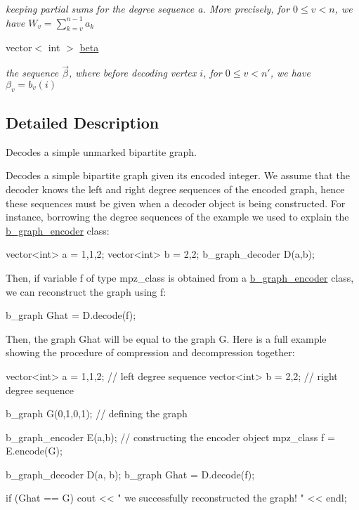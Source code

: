 \begin{DoxyCompactItemize}
\begin{DoxyCompactList}\small\item\em keeping partial sums for the degree sequence a. More precisely, for $0 \leq v < n$, we have $W_v = \sum_{k=v}^{n-1} a_k$ \end{DoxyCompactList}\item 
vector$<$ int $>$ \hyperlink{classb__graph__decoder_a3e5babfb07af486c1d9e991f65251266}{beta}
\begin{DoxyCompactList}\small\item\em the sequence $\vec{\beta}$, where before decoding vertex $i$, for $0 \leq v < n'$, we have $\beta_v = b_v(i)$ \end{DoxyCompactList}\end{DoxyCompactItemize}


\subsection{Detailed Description}
Decodes a simple unmarked bipartite graph. 

Decodes a simple bipartite graph given its encoded integer. We assume that the decoder knows the left and right degree sequences of the encoded graph, hence these sequences must be given when a decoder object is being constructed. For instance, borrowing the degree sequences of the example we used to explain the \hyperlink{classb__graph__encoder}{b\+\_\+graph\+\_\+encoder} class\+: \begin{DoxyVerb}vector<int> a = {1,1,2};
vector<int> b = {2,2};
b_graph_decoder D(a,b);
\end{DoxyVerb}


Then, if variable f of type mpz\+\_\+class is obtained from a \hyperlink{classb__graph__encoder}{b\+\_\+graph\+\_\+encoder} class, we can reconstruct the graph using f\+: \begin{DoxyVerb}b_graph Ghat = D.decode(f);
\end{DoxyVerb}


Then, the graph Ghat will be equal to the graph G. Here is a full example showing the procedure of compression and decompression together\+: \begin{DoxyVerb}vector<int> a = {1,1,2}; // left degree sequence 
vector<int> b = {2,2}; // right degree sequence

b_graph G({{0},{1},{0,1}}); // defining the graph

b_graph_encoder E(a,b); // constructing the encoder object
mpz_class f = E.encode(G);

b_graph_decoder D(a, b);
b_graph Ghat = D.decode(f);

if (Ghat == G)
  cout << " we successfully reconstructed the graph! " << endl;\end{DoxyVerb}
 

